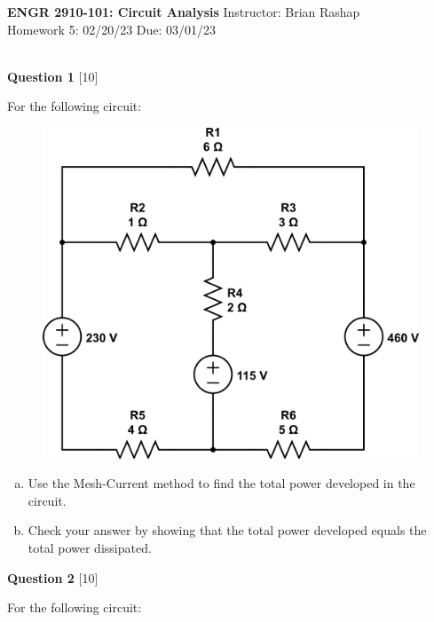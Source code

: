 \documentclass[12pt]{article}
\begin{document}
\begin{center}
\hfil
{\large\bf {ENGR 2910-101: Circuit Analysis}}
\hfill Instructor: Brian Rashap\\
Homework 5: 02/20/23 \hfill Due: 03/01/23\\
\hrulefill\\
\end{center}

{\bf Question 1} [10] %

For the following circuit:

\begin{figure}[h!]
\begin{center}
 \includegraphics[scale=0.4]{fig4_37.png}
\end{center}
\end{figure}

\begin{enumerate}[(a)]
\item Use the Mesh-Current method to find the total power developed in the circuit.
\item Check your answer by showing that the total power developed equals the total power dissipated.
\end{enumerate}


\vspace{0.1in}

{\bf Question 2} [10] %

For the following circuit:
\end{document}
